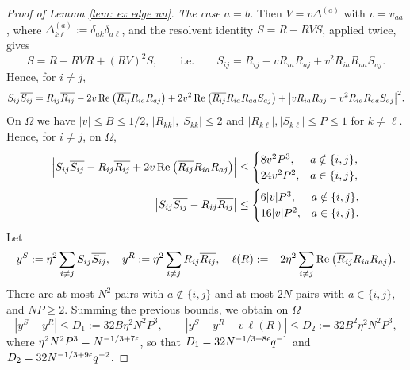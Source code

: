 \begin{proof}[Proof of Lemma \ref{lem: ex edge un}]
\textit{The case $a = b$.} Then $V=v\Delta^{(a)}$ with $v=v_{aa}$, where $\Delta^{(a)}_{k\ell}:=\delta_{ak}\delta_{a\ell}$, and the resolvent identity $S=R-RVS$, applied twice, gives
\begin{equation}
S = R - RVR + (RV)^2 S, \qquad\text{i.e.}\qquad S_{ij}=R_{ij}-vR_{ia}R_{aj}+v^2R_{ia}R_{aa}S_{aj}.
\end{equation}
Hence, for $i\ne j$,
\begin{equation} \label{eq:short_exp}
S_{ij} \overline{S_{ij}} = R_{ij} \overline{R_{ij}} - 2v\,\mathrm{Re}\:\big(\overline{R_{ij}}R_{ia}R_{aj}\big) + 2v^2\,\mathrm{Re}\:\big(\overline{R_{ij}}R_{ia}R_{aa}S_{aj}\big) + \big|vR_{ia}R_{aj}-v^2R_{ia}R_{aa}S_{aj}\big|^2 .
\end{equation}
On $\Omega$ we have $|v|\le B\le1/2$, $|R_{kk}|,|S_{kk}|\le2$ and $|R_{k\ell}|,|S_{k\ell}|\le P\le1$ for $k\ne\ell$. Hence, for $i\ne j$, on $\Omega$,
\begin{equation}
\begin{split}
\Big|S_{ij}\overline{S_{ij}}-R_{ij}\overline{R_{ij}}+2v\,\mathrm{Re}\:\big(\overline{R_{ij}}R_{ia}R_{aj}\big)\Big|&\le\begin{cases}8v^2P^3, & a\notin\{i,j\},\\ 24v^2P^2, & a\in\{i,j\},\end{cases}\\
\big|S_{ij}\overline{S_{ij}}-R_{ij}\overline{R_{ij}}\big|&\le\begin{cases}6|v|P^3, & a\notin\{i,j\},\\ 16|v|P^2, & a\in\{i,j\}.\end{cases}
\end{split}
\end{equation}
Let
\begin{equation} \label{eq:def_y^R}
y^S := \eta^2 \sum_{i \neq j} S_{ij} \overline{S_{ij}}, \quad y^R := \eta^2 \sum_{i \neq j} R_{ij} \overline{R_{ij}}, \quad \ell(R):=-2\eta^2\sum_{i\ne j}\mathrm{Re}\:\big(\overline{R_{ij}}R_{ia}R_{aj}\big).
\end{equation}
There are at most $N^2$ pairs with $a\notin\{i,j\}$ and at most $2N$ pairs with $a\in\{i,j\}$, and $NP\ge2$. Summing the previous bounds, we obtain on $\Omega$
\begin{equation}
|y^S - y^R| \leq D_1:=32B\eta^2N^2P^3, \qquad |y^S-y^R-v\,\ell(R)|\le D_2:=32B^2\eta^2N^2P^3,
\end{equation}
where $\eta^2N^2P^3=N^{-1/3+7\epsilon}$, so that $D_1=32N^{-1/3+8\epsilon}q^{-1}$ and $D_2=32N^{-1/3+9\epsilon}q^{-2}$.


\end{proof}
